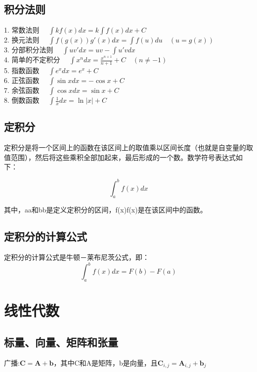 \documentclass{article}
\begin{document}
\subsection{积分法则}
1. 常数法则 $\quad\int k f(x) dx = k \int f(x) dx + C$   \\
2. 换元法则 $\quad\int f(g(x)) g'(x) dx = \int f(u) du \quad (u=g(x))$   \\
3. 分部积分法则 $\quad\int u v' dx = u v - \int u' v dx$   \\
4. 简单的不定积分 $\quad\int x^n dx = \frac{x^{n+1}}{n+1} + C \quad (n \neq -1)$   \\
5. 指数函数 $\quad\int e^x dx = e^x + C$   \\
6. 正弦函数 $\quad\int \sin x dx = -\cos x + C$   \\
7. 余弦函数 $\quad\int \cos x dx = \sin x + C$   \\
8. 倒数函数 $\quad\int \frac{1}{x} dx = \ln|x| + C$   \\


\subsection{定积分}
定积分是将一个区间上的函数在该区间上的取值乘以区间长度（也就是自变量的取值范围），然后将这些乘积全部加起来，最后形成的一个数。数学符号表达式如下：

$$ \int_a^b f(x)dx $$

其中，aa和bb是定义定积分的区间，f(x)f(x)是在该区间中的函数。

\subsection{定积分的计算公式}
定积分的计算公式是牛顿－莱布尼茨公式，即：
$$ \int_a^b f(x)dx=F(b)-F(a) $$


\section{线性代数}
\subsection{标量、向量、矩阵和张量} 
广播:$\mathbf{C}=\mathbf{A}+\boldsymbol{b}$，其中C和A是矩阵，b是向量，且$\mathbf{C}_{i,j}=\mathbf{A}_{i,j}+\boldsymbol{b}_j$
\end{document}
